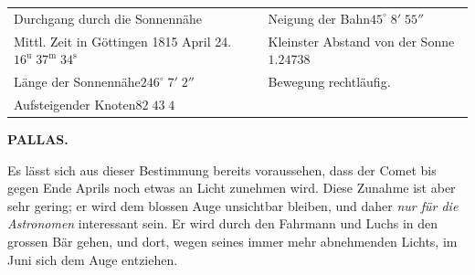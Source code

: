 \begin{center}\fontsize{9}{11}\selectfont
\setlength{\tabcolsep}{4pt}
\renewcommand{\arraystretch}{1.12}
\begin{tabular}{@{}p{.51\linewidth}|p{.45\linewidth}@{}}
Durchgang durch die Sonnennähe & Neigung der Bahn\dotfill $45^\circ\;8'\;55''$ \\
\quad Mittl. Zeit in Göttingen 1815 April 24.\newline
\hfill $16^{\mathrm u}\;37^{\mathrm m}\;34^{\mathrm s}$ &
Kleinster Abstand von der Sonne\newline \hfill $1.24738$ \\
Länge der Sonnennähe\dotfill $246^\circ\;7'\;2''$ & Bewegung rechtläufig. \\
Aufsteigender Knoten\dotfill $82\;43\;4$ & \\
\end{tabular}
\end{center}

\clearpage
\thispagestyle{empty}
\noindent{}%
\makebox[12mm][l]{}%
\parbox[t]{\dimexpr\linewidth-24mm\relax}{\centering\footnotesize\bfseries PALLAS.\par}%
\par\nobreak\medskip
\par\indent Es lässt sich aus dieser Bestimmung bereits voraussehen, dass der Comet bis gegen Ende Aprils noch etwas an Licht zunehmen wird. Diese Zunahme ist aber sehr gering; er wird dem blossen Auge unsichtbar bleiben, und daher \emph{nur für die Astronomen} interessant sein. Er wird durch den Fahrmann und Luchs in den grossen Bär gehen, und dort, wegen seines immer mehr abnehmenden Lichts, im Juni sich dem Auge entziehen.
